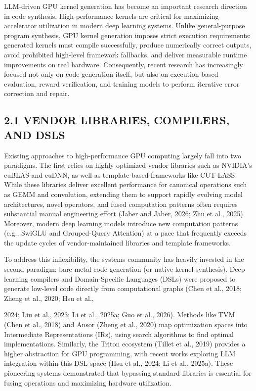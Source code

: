 \documentclass[
  10
]{article}
\begin{document}
LLM-driven GPU kernel generation has become an important research
direction in code synthesis. High-performance kernels are critical for
maximizing accelerator utilization in modern deep learning systems.
Unlike general-purpose program synthesis, GPU kernel generation imposes
strict execution requirements: generated kernels must compile
successfully, produce numerically correct outputs, avoid prohibited
high-level framework fallbacks, and deliver measurable runtime
improvements on real hardware. Consequently, recent research has
increasingly focused not only on code generation itself, but also on
execution-based evaluation, reward verification, and training models to
perform iterative error correction and repair.

\subsection{2.1 VENDOR LIBRARIES, COMPILERS, AND
DSLS}\label{vendor-libraries-compilers-and-dsls}

Existing approaches to high-performance GPU computing largely fall into
two paradigms. The first relies on highly optimized vendor libraries
such as NVIDIA's cuBLAS and cuDNN, as well as template-based frameworks
like CUT-LASS. While these libraries deliver excellent performance for
canonical operations such as GEMM and convolution, extending them to
support rapidly evolving model architectures, novel operators, and fused
computation patterns often requires substantial manual engineering
effort (Jaber and Jaber, 2026; Zhu et al., 2025). Moreover, modern deep
learning models introduce new computation patterns (e.g., SwiGLU and
Grouped-Query Attention) at a pace that frequently exceeds the update
cycles of vendor-maintained libraries and template frameworks.

To address this inflexibility, the systems community has heavily
invested in the second paradigm: bare-metal code generation (or native
kernel synthesis). Deep learning compilers and Domain-Specific Languages
(DSLs) were proposed to generate low-level code directly from
computational graphs (Chen et al., 2018; Zheng et al., 2020; Hsu et al.,

2024; Liu et al., 2023; Li et al., 2025a; Guo et al., 2026). Methods
like TVM (Chen et al., 2018) and Ansor (Zheng et al., 2020) map
optimization spaces into Intermediate Representations (IRs), using
search algorithms to find optimal implementations. Similarly, the Triton
ecosystem (Tillet et al., 2019) provides a higher abstraction for GPU
programming, with recent works exploring LLM integration within this DSL
space (Hsu et al., 2024; Li et al., 2025a). These pioneering systems
demonstrated that bypassing standard libraries is essential for fusing
operations and maximizing hardware utilization.
\end{document}
